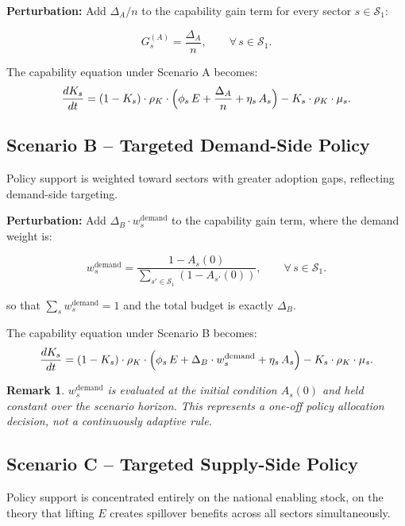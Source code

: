 \documentclass[11pt,a4paper]{article}
\newtheorem{remark}{Remark}
\begin{document}
\textbf{Perturbation:} Add $\Delta_A / n$ to the capability gain term for every sector $s \in \mathcal{S}_1$:

\begin{equation}
G_s^{(A)} = \frac{\Delta_A}{n}, \qquad \forall\, s \in \mathcal{S}_1.
\label{eq:scenA}
\end{equation}

The capability equation under Scenario A becomes:
\[
\frac{dK_s}{dt}
= (1 - K_s)\cdot\rho_K\cdot\Bigl(\phi_s\, E + \frac{\Delta_A}{n} + \eta_s\, A_s\Bigr)
- K_s\cdot\rho_K\cdot\mu_s.
\]

\subsection{Scenario B -- Targeted Demand-Side Policy}

Policy support is weighted toward sectors with greater adoption gaps, reflecting demand-side targeting.

\textbf{Perturbation:} Add $\Delta_B \cdot w_s^{\text{demand}}$ to the capability gain term, where the demand weight is:

\begin{equation}
w_s^{\text{demand}} = \frac{1 - A_s(0)}{\displaystyle\sum_{s' \in \mathcal{S}_1}(1 - A_{s'}(0))}, \qquad \forall\, s \in \mathcal{S}_1.
\label{eq:demandweight}
\end{equation}

so that $\sum_s w_s^{\text{demand}} = 1$ and the total budget is exactly $\Delta_B$.

The capability equation under Scenario B becomes:
\[
\frac{dK_s}{dt}
= (1 - K_s)\cdot\rho_K\cdot\Bigl(\phi_s\, E + \Delta_B\cdot w_s^{\text{demand}} + \eta_s\, A_s\Bigr)
- K_s\cdot\rho_K\cdot\mu_s.
\]

\begin{remark}
$w_s^{\text{demand}}$ is evaluated at the initial condition $A_s(0)$ and held constant over the scenario horizon. This represents a one-off policy allocation decision, not a continuously adaptive rule.
\end{remark}

\subsection{Scenario C -- Targeted Supply-Side Policy}

Policy support is concentrated entirely on the national enabling stock, on the theory that lifting $E$ creates spillover benefits across all sectors simultaneously.
\end{document}
